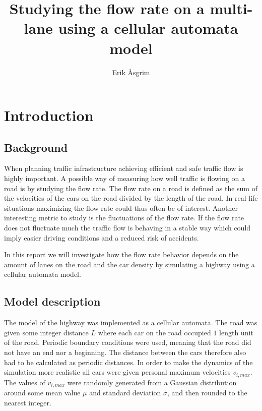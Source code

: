\documentclass[a4paper,12pt]{article}
\title{Studying the flow rate on a multi-lane using a cellular automata model}
\author{Erik Åsgrim}
\begin{document}
\maketitle

\section*{Introduction}
\subsection*{Background}
When planning traffic infrastructure achieving efficient and safe traffic flow is highly important.
A possible way of measuring how well traffic is flowing on a road is by studying the flow rate.
The flow rate on a road is defined as the sum of the velocities of the cars on the road divided by the length of the road.
In real life situations maximizing the flow rate could thus often be of interest. Another interesting metric to study is the fluctuations of the 
flow rate. If the flow rate does not fluctuate much the traffic flow is behaving in a stable way which could imply easier
driving conditions and a reduced risk of accidents.

In this report we will investigate how the flow rate behavior depends on the amount of lanes on the road and the car density by simulating
a highway using a cellular automata model.

\subsection*{Model description}
The model of the highway was implemented as a cellular automata. The road was given some integer distance $L$ where each car on the road occupied $1$ length unit of the road. 
Periodic boundary conditions were used, meaning that the road did not have an end nor a beginning. The distance between the cars therefore also had to be calculated as periodic distances.
In order to make the dynamics of the simulation more realistic all cars were given personal maximum velocities $v_{i,max}$. The values of $v_{i, max}$ were randomly generated 
from a Gaussian distribution around some mean value $\mu$ and standard deviation $\sigma$, and then rounded to the nearest integer.
\end{document}
